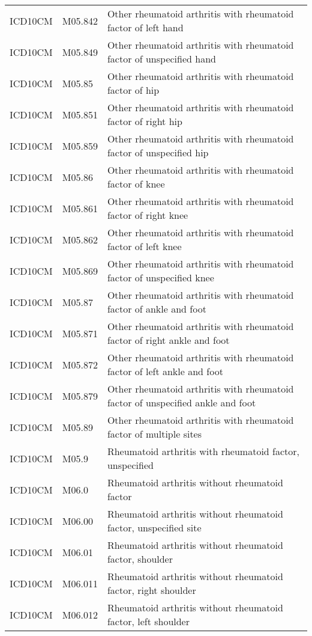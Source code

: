 \begin{longtable}{p{}p{}p{}}
  ICD10CM & M05.842 & Other rheumatoid arthritis with rheumatoid factor of left hand \\ 
  ICD10CM & M05.849 & Other rheumatoid arthritis with rheumatoid factor of unspecified hand \\ 
  ICD10CM & M05.85 & Other rheumatoid arthritis with rheumatoid factor of hip \\ 
  ICD10CM & M05.851 & Other rheumatoid arthritis with rheumatoid factor of right hip \\ 
  ICD10CM & M05.859 & Other rheumatoid arthritis with rheumatoid factor of unspecified hip \\ 
  ICD10CM & M05.86 & Other rheumatoid arthritis with rheumatoid factor of knee \\ 
  ICD10CM & M05.861 & Other rheumatoid arthritis with rheumatoid factor of right knee \\ 
  ICD10CM & M05.862 & Other rheumatoid arthritis with rheumatoid factor of left knee \\ 
  ICD10CM & M05.869 & Other rheumatoid arthritis with rheumatoid factor of unspecified knee \\ 
  ICD10CM & M05.87 & Other rheumatoid arthritis with rheumatoid factor of ankle and foot \\ 
  ICD10CM & M05.871 & Other rheumatoid arthritis with rheumatoid factor of right ankle and foot \\ 
  ICD10CM & M05.872 & Other rheumatoid arthritis with rheumatoid factor of left ankle and foot \\ 
  ICD10CM & M05.879 & Other rheumatoid arthritis with rheumatoid factor of unspecified ankle and foot \\ 
  ICD10CM & M05.89 & Other rheumatoid arthritis with rheumatoid factor of multiple sites \\ 
  ICD10CM & M05.9 & Rheumatoid arthritis with rheumatoid factor, unspecified \\ 
  ICD10CM & M06.0 & Rheumatoid arthritis without rheumatoid factor \\ 
  ICD10CM & M06.00 & Rheumatoid arthritis without rheumatoid factor, unspecified site \\ 
  ICD10CM & M06.01 & Rheumatoid arthritis without rheumatoid factor, shoulder \\ 
  ICD10CM & M06.011 & Rheumatoid arthritis without rheumatoid factor, right shoulder \\ 
  ICD10CM & M06.012 & Rheumatoid arthritis without rheumatoid factor, left shoulder \\ 

\end{longtable}
